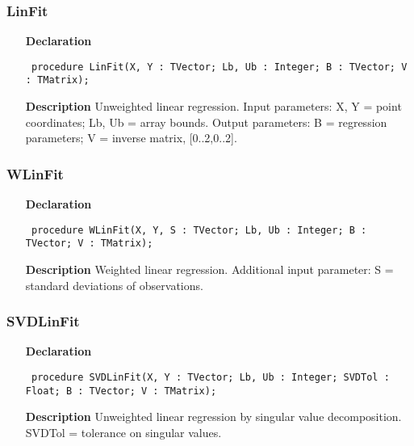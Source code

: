 \documentclass[12pt,a4paper,oneside]{report}
\newcommand{\declarationitem}[1]{\textbf{#1}}
\newcommand{\descriptiontitle}[1]{\textbf{#1}}
\newcommand{\code}[1]{\texttt{#1}}
\begin{document}
\subsubsection{LinFit}
\label{ulinfit-LinFit}
\begin{itemize}\item[\declarationitem{Declaration}\hfill]
	\begin{flushleft}
		\code{
			procedure LinFit(X, Y : TVector; Lb, Ub : Integer; B : TVector; V : TMatrix);}
		
	\end{flushleft}
	
	\par
	\item[\descriptiontitle{Description}]
	Unweighted linear regression. Input parameters: X, Y = point coordinates; Lb, Ub = array bounds. Output parameters: B = regression parameters; V = inverse matrix, [0..2,0..2].
	
\end{itemize}
\subsubsection{WLinFit}
\label{ulinfit-WLinFit}
\begin{itemize}\item[\declarationitem{Declaration}\hfill]
	\begin{flushleft}
		\code{
			procedure WLinFit(X, Y, S : TVector; Lb, Ub : Integer; B : TVector; V : TMatrix);}
		
	\end{flushleft}
	
	\par
	\item[\descriptiontitle{Description}]
	Weighted linear regression. Additional input parameter: S = standard deviations of observations.
	
\end{itemize}
\subsubsection{SVDLinFit}
\label{ulinfit-SVDLinFit}
\begin{itemize}\item[\declarationitem{Declaration}\hfill]
	\begin{flushleft}
		\code{
			procedure SVDLinFit(X, Y : TVector; Lb, Ub : Integer; SVDTol : Float; B : TVector; V : TMatrix);}
		
	\end{flushleft}
	
	\par
	\item[\descriptiontitle{Description}]
	Unweighted linear regression by singular value decomposition. SVDTol = tolerance on singular values.
	
\end{itemize}
\end{document}
